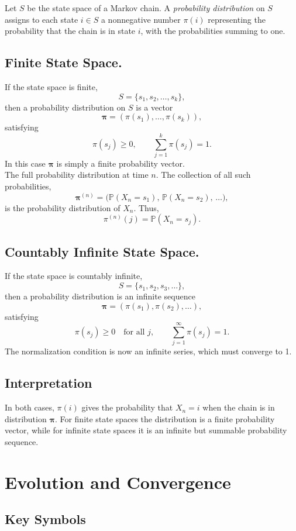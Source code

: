 Let $S$ be the state space of a Markov chain. A \emph{probability distribution} on $S$
assigns to each state $i \in S$ a nonnegative number $\pi(i)$ representing the probability
that the chain is in state $i$, with the probabilities summing to one.

\subsection{Finite State Space.}
If the state space is finite,
\[
S = \{s_1, s_2, \dots, s_k\},
\]
then a probability distribution on $S$ is a vector
\[
\boldsymbol{\pi} = (\pi(s_1), \dots, \pi(s_k)),
\]
satisfying
\[
\pi(s_j) \ge 0, \qquad \sum_{j=1}^k \pi(s_j) = 1.
\]
In this case $\boldsymbol{\pi}$ is simply a finite probability vector.\\

The full probability distribution at time $n$.
The collection of all such probabilities,
\[
\boldsymbol{\pi}^{(n)} = 
\big( \mathbb{P}(X_n = s_1),\, \mathbb{P}(X_n = s_2),\, \dots \big),
\]
is the probability distribution of $X_n$.  Thus,
\[
\pi^{(n)}(j) = \mathbb{P}(X_n = s_j).
\]

\subsection{Countably Infinite State Space.}
If the state space is countably infinite,
\[
S = \{s_1, s_2, s_3, \dots\},
\]
then a probability distribution is an infinite sequence
\[
\boldsymbol{\pi} = (\pi(s_1), \pi(s_2), \ldots),
\]
satisfying
\[
\pi(s_j) \ge 0 \quad \text{for all } j, \qquad
\sum_{j=1}^{\infty} \pi(s_j) = 1.
\]
The normalization condition is now an infinite series, which must converge to 1.

\subsection{Interpretation}
In both cases, $\pi(i)$ gives the probability that $X_n = i$ when the chain is in
distribution $\boldsymbol{\pi}$. For finite state spaces the distribution is a finite
probability vector, while for infinite state spaces it is an infinite but summable
probability sequence.


\section{Evolution and Convergence}

\subsection{Key Symbols}

